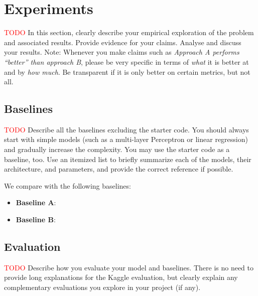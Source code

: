 \documentclass{article}
\begin{document}
\section{Experiments}
\label{sec:experiments}
% 
\textcolor{red}{TODO} In this section, clearly describe your empirical exploration of the problem and associated results. Provide evidence for your claims.
Analyse and discuss your results.
Note: Whenever you make claims such as \textit{Approach A performs ``better'' than approach B}, please be very specific in terms of \emph{what} it is better at and by \emph{how much}. Be transparent if it is only better on certain metrics, but not all.
\subsection{Baselines}
\label{sec:baselines}
\textcolor{red}{TODO} Describe all the baselines excluding the starter code. You should always start with simple models (such as a multi-layer Perceptron or linear regression) and gradually increase the complexity. You may use the starter code as a baseline, too.
Use an itemized list to briefly summarize each of the models, their architecture, and parameters, and provide the correct reference if possible.

We compare with the following baselines:
\begin{itemize}
    \item \textbf{Baseline A}:
    \item \textbf{Baseline B}: 
\end{itemize}
% 
\subsection{Evaluation}
\label{sec:evaluation}
\textcolor{red}{TODO} Describe how you evaluate your model and baselines. There is no need to provide long explanations for the Kaggle evaluation, but clearly explain any complementary evaluations you explore in your project (if any).
% 
\end{document}
